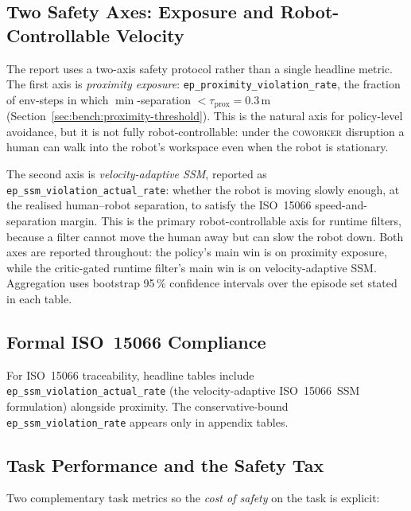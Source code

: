 \documentclass[11pt,a4paper]{report}
\newcommand{\ssm}{SSM}
\newcommand{\iso}{ISO~15066}
\newcommand{\coworker}{\textsc{coworker}}
\begin{document}
\subsection{Two Safety Axes: Exposure and Robot-Controllable Velocity}
\label{sec:setup:metrics:primary}

The report uses a two-axis safety protocol rather than a single
headline metric. The first axis is \emph{proximity exposure}:
\texttt{ep\_proximity\_violation\_rate}, the fraction of env-steps in
which $\min$-separation $< \tau_{\mathrm{prox}} = 0.3$\,m
(Section~\ref{sec:bench:proximity-threshold}). This is the natural
axis for policy-level avoidance, but it is not fully robot-controllable:
under the \coworker{} disruption a human can walk into the robot's
workspace even when the robot is stationary.

The second axis is \emph{velocity-adaptive \ssm{}}, reported as
\texttt{ep\_ssm\_violation\_actual\_rate}: whether the robot is moving
slowly enough, at the realised human--robot separation, to satisfy the
\iso{} speed-and-separation margin. This is the primary
robot-controllable axis for runtime filters, because a filter cannot
move the human away but can slow the robot down. Both axes are reported
throughout: the policy's main win is on proximity exposure, while the
critic-gated runtime filter's main win is on velocity-adaptive \ssm{}.
Aggregation uses bootstrap 95\,\% confidence intervals over the
episode set stated in each table.

\subsection{Formal \iso{} Compliance}
\label{sec:setup:metrics:iso}

For \iso{} traceability, headline tables include
\texttt{ep\_ssm\_violation\_actual\_rate} (the velocity-adaptive
\iso{}~\ssm{} formulation) alongside proximity. The
conservative-bound \texttt{ep\_ssm\_violation\_rate} appears only
in appendix tables.

\subsection{Task Performance and the Safety Tax}
\label{sec:setup:metrics:task}

Two complementary task metrics so the \emph{cost of safety} on the
task is explicit:
\end{document}
